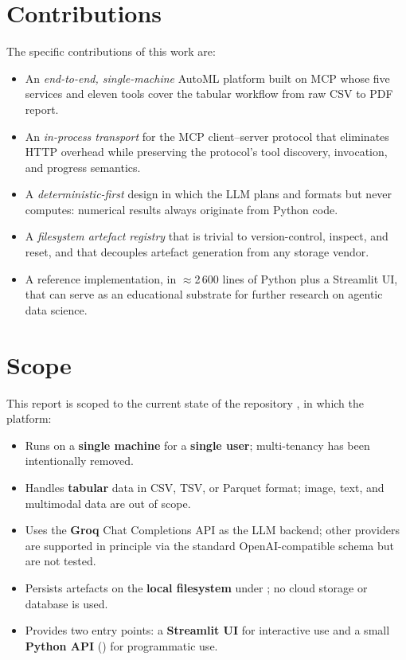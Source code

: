 \section{Contributions}
\label{sec:contributions}

The specific contributions of this work are:

\begin{itemize}[leftmargin=1.4em]
  \item An \emph{end-to-end, single-machine} AutoML platform built on
        MCP whose five services and eleven tools cover the tabular
        workflow from raw CSV to PDF report.
  \item An \emph{in-process transport} for the MCP client--server
        protocol that eliminates HTTP overhead while preserving the
        protocol's tool discovery, invocation, and progress semantics.
  \item A \emph{deterministic-first} design in which the LLM plans
        and formats but never computes: numerical results always
        originate from Python code.
  \item A \emph{filesystem artefact registry} that is trivial to
        version-control, inspect, and reset, and that decouples
        artefact generation from any storage vendor.
  \item A reference implementation, in $\approx$2\,600 lines of
        Python plus a Streamlit UI, that can serve as an educational
        substrate for further research on agentic data science.
\end{itemize}

\section{Scope}
\label{sec:scope}

This report is scoped to the current state of the repository
, in which the platform:

\begin{itemize}[leftmargin=1.4em]
  \item Runs on a \textbf{single machine} for a \textbf{single user};
        multi-tenancy has been intentionally removed.
  \item Handles \textbf{tabular} data in CSV, TSV, or Parquet format;
        image, text, and multimodal data are out of scope.
  \item Uses the \textbf{Groq} Chat Completions API as the LLM backend;
        other providers are supported in principle via the standard
        OpenAI-compatible schema but are not tested.
  \item Persists artefacts on the \textbf{local filesystem} under
        ; no cloud storage or database is used.
  \item Provides two entry points: a \textbf{Streamlit UI} for
        interactive use and a small \textbf{Python API}
        () for programmatic use.
\end{itemize}

